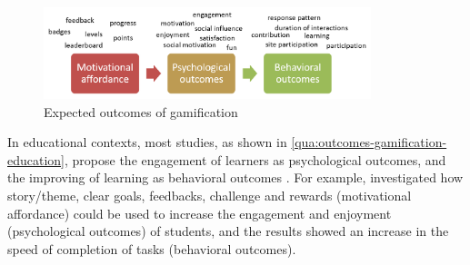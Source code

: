 \begin{figure}[htb]
 \caption{Expected outcomes of gamification}
 \label{fig:outcomes-gamification}
 \centering
 \includegraphics[width=0.85\textwidth]{images/chap-general-background/outcomes-gamification.png}
\end{figure}


In educational contexts, most studies, as shown in \autoref{qua:outcomes-gamification-education}, propose the engagement of learners as psychological outcomes, and the improving of learning as behavioral outcomes \cite{BorgesDurelliReisIsotani2014}.
For example,  investigated how story/theme, clear goals, feedbacks, challenge and rewards (motivational affordance) could be used to increase the engagement and enjoyment (psychological outcomes) of students, and the results showed an increase in the speed of completion of tasks (behavioral outcomes).


